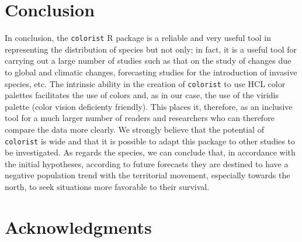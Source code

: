 \documentclass[12pt,a4paper]{article}
\begin{document}
\section{Conclusion}
In conclusion, the \texttt{colorist} R package is a reliable and very useful tool in representing the distribution of species but not only; in fact, it is a useful tool for carrying out a large number of studies such as that on the study of changes due to global and climatic changes, forecasting studies for the introduction of invasive species, etc.
The intrinsic ability in the creation of \texttt{colorist} to use HCL color palettes facilitates the use of colors and, as in our case, the use of the viridis palette (color vision deficienty friendly).
This places it, therefore, as an inclusive tool for a much larger number of readers and researchers who can therefore compare the data more clearly.
We strongly believe that the potential of \texttt{colorist} is wide and that it is possible to adapt this package to other studies to be investigated.
As regards the species, we can conclude that, in accordance with the initial hypotheses, according to future forecasts they are destined to have a negative population trend with the territorial movement, especially towards the north, to seek situations more favorable to their survival.


\section{Acknowledgments}





\newpage
\end{document}
